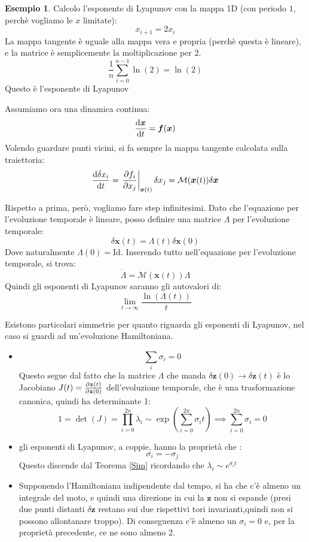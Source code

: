 \documentclass[a4paper,12pt]{article}
\theoremstyle{plain}
\renewcommand{\vec}[1]{{\boldsymbol{#1}}}
\theoremstyle{definition}
\newtheorem{exmp}{Esempio}[section]
\newcommand{\Op}[1]{\mathcal{#1}}
\newcommand{\f}[2]{\frac{#1}{#2}}
\renewcommand{\unit}{\text{Id}}
\newcommand{\pos}{\vec{x}}
\theoremstyle{remark}
\begin{document}
\begin{exmp}
	Calcolo l'esponente di Lyapunov con la mappa 1D (con periodo $1$, perchè vogliamo le $x$ limitate):
	\[x_{i+1}=2x_i\]
	La mappa tangente è uguale alla mappa vera e propria (perchè questa è lineare), e la matrice è semplicemente la moltiplicazione per $2$.
	\[\f{1}{n}		\sum_{i=0}^{n-1} \ln(2)=\ln(2)	\]
	Questo è l'esponente di Lyapunov
	
	
	
\end{exmp}




Assumiamo ora una dinamica continua:
\[\dv{\pos}{t}=\vec{f}(\pos)	\]
Volendo guardare punti vicini, si fa sempre la mappa tangente calcolata sulla traiettoria:
\[\dv{\delta x_i}{t}=\left.{\pdv{{f}_i}{x_j}}\right|_{\pos(t)}{\delta x_j}=\Op{M}(\vec{x}(t)) \delta \pos				\]

Rispetto a prima, però, vogliamo fare step infinitesimi. Dato che l'equazione per l'evoluzione temporale è lineare, posso definire una matrice $\Lambda$ per l'evoluzione temporale:
\[\delta \pos(t)=\Lambda(t) \delta \pos(0)		\]
Dove naturalmente $\Lambda(0)=\unit$.
Inserendo tutto nell'equazione per l'evoluzione temporale, si trova:
\[\dot{\Lambda}=\Op{M}(\vec{x}(t))\Lambda			\]
Quindi gli esponenti di Lyapunov saranno gli autovalori di:
\[\lim_{t\rightarrow\infty}	\f{\ln(\Lambda(t))}{t}		\]


Esistono particolari simmetrie per quanto riguarda gli esponenti di Lyapunov, nel caso si guardi ad un'evoluzione Hamiltoniana.
\begin{itemize}
	\item  \[\sum_i \sigma_i=0\]
	Questo segue dal fatto che la matrice $\Lambda$ che manda $\delta \vec{z}(0)\rightarrow\delta \vec{z}(t)$ è lo Jacobiano $J(t)=\pdv{\vec{z}(t)}{\vec{z}(0)}$ dell'evoluzione temporale, che è una trasformazione canonica, quindi ha determinante 1:
	\[1=\det(J)=\prod_{i=0}^{2n} \lambda_i\sim\exp(\sum_{i=0}^{2n} \sigma_i t  )\implies\sum_{i=0}^{2n} \sigma_i=0 		\]
	\item  gli esponenti di Lyapunov, a coppie, hanno la proprietà che :
		\[\sigma_i=-\sigma_j\]
		Questo discende dal Teorema \ref{Sim} ricordando che $\lambda_i\sim e^{\sigma_it}$
	\item  Supponendo l'Hamiltoniana indipendente dal tempo, si ha che c'è almeno un integrale del moto, e quindi una direzione in cui la $\vec{z}$ non si espande (presi due punti distanti $\delta \vec{z}$ restano sui due rispettivi tori invarianti,quindi non si possono allontanare troppo). Di conseguenza c'è almeno un $\sigma_i=0$ e, per la proprietà precedente, ce ne sono almeno 2.
\end{itemize}
\end{document}
